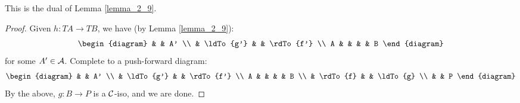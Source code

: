 \begin{rmk}
This is the dual of Lemma \ref{lemma_2_9}.
\end{rmk}

\begin{proof}
Given $h: TA \to TB$, we have (by Lemma 
\ref{lemma_2_9}):
\[
\begin{diagram}
  &           & A' \\
  & \ldTo{g'} &    & \rdTo{f'} \\
A &           &    &           & B
\end{diagram}
\]
for some $A' \in \mathcal{A}$. Complete to a push-forward diagram:
\[
\begin{diagram}
  &           & A' \\
  & \ldTo{g'} &    & \rdTo{f'} \\
A &           &    &           & B \\
  & \rdTo{f}  &    & \ldTo{g}  \\
  &           & P
\end{diagram}
\]
By the above, $g: B \to P$ is a $\mathcal{C}$-iso, and we are done.
\end{proof}
